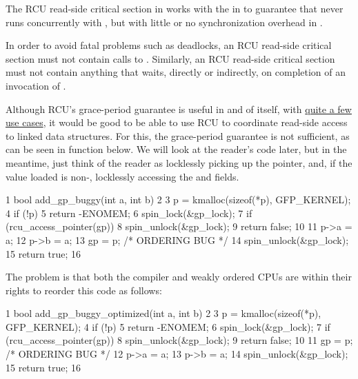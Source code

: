 The RCU read-side critical section in  works with
the  in  to guarantee that
 never runs concurrently with , but with
little or no synchronization overhead in .

\QuickQuizEnd

In order to avoid fatal problems such as deadlocks, an RCU read-side
critical section must not contain calls to .
Similarly, an RCU read-side critical section must not contain anything
that waits, directly or indirectly, on completion of an invocation of
.

Although RCU's grace-period guarantee is useful in and of itself, with
\href{https://lwn.net/Articles/573497/}{quite a few use cases}, it would
be good to be able to use RCU to coordinate read-side access to linked
data structures.
For this, the grace-period guarantee is not sufficient,
as can be seen in function  below.
We will look at the
reader's code later, but in the meantime, just think of the reader as
locklessly picking up the  pointer, and, if the value loaded is
non-, locklessly accessing the  and  fields.

\begin{VerbatimN}
       1 bool add_gp_buggy(int a, int b)
       2 {
       3   p = kmalloc(sizeof(*p), GFP_KERNEL);
       4   if (!p)
       5     return -ENOMEM;
       6   spin_lock(&gp_lock);
       7   if (rcu_access_pointer(gp)) {
       8     spin_unlock(&gp_lock);
       9     return false;
      10   }
      11   p->a = a;
      12   p->b = a;
      13   gp = p; /* ORDERING BUG */
      14   spin_unlock(&gp_lock);
      15   return true;
      16 }
\end{VerbatimN}

The problem is that both the compiler and weakly ordered CPUs are within
their rights to reorder this code as follows:

\begin{VerbatimN}
       1 bool add_gp_buggy_optimized(int a, int b)
       2 {
       3   p = kmalloc(sizeof(*p), GFP_KERNEL);
       4   if (!p)
       5     return -ENOMEM;
       6   spin_lock(&gp_lock);
       7   if (rcu_access_pointer(gp)) {
       8     spin_unlock(&gp_lock);
       9     return false;
      10   }
      11   gp = p; /* ORDERING BUG */
      12   p->a = a;
      13   p->b = a;
      14   spin_unlock(&gp_lock);
      15   return true;
      16 }
\end{VerbatimN}

